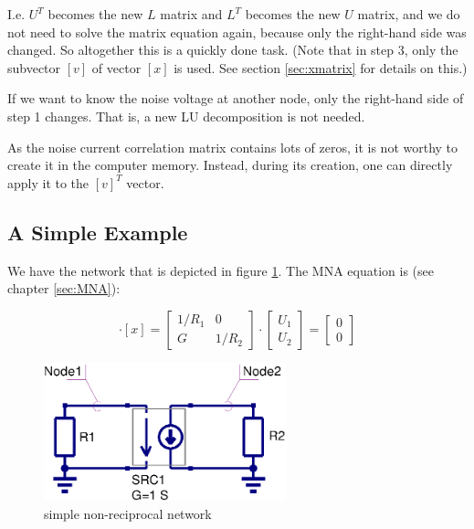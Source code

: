 I.e. $U^T$ becomes the new $L$ matrix and $L^T$ becomes the new $U$
matrix, and we do not need to solve the matrix equation again, because
only the right-hand side was changed.  So altogether this is a quickly
done task.  (Note that in step 3, only the subvector $[v]$ of vector
$[x]$ is used.  See section \ref{sec:xmatrix} for details on this.)

\addvspace{12pt}

If we want to know the noise voltage at another node, only the
right-hand side of step 1 changes.  That is, a new LU decomposition is
not needed.

\addvspace{12pt}

As the noise current correlation matrix contains lots of zeros, it is
not worthy to create it in the computer memory.  Instead, during its
creation, one can directly apply it to the $\left[v\right]^T$ vector.



\subsection{A Simple Example}

We have the network that is depicted in figure \ref{fig:mna_noise1}.
The MNA equation is (see chapter \ref{sec:MNA}):

\begin{equation}
[A]\cdot [x] =
\begin{bmatrix}
1/R_1 & 0\\
  G   & 1/R_2
\end{bmatrix}
\cdot
\begin{bmatrix}
U_1\\
U_2
\end{bmatrix}
=
\begin{bmatrix}
0\\
0
\end{bmatrix}
\end{equation}

\begin{figure}[ht]
\begin{center}
\includegraphics[width=7cm]{MNAnoise1}
\end{center}
\caption{simple non-reciprocal network}
\label{fig:mna_noise1}
\end{figure}
\FloatBarrier

